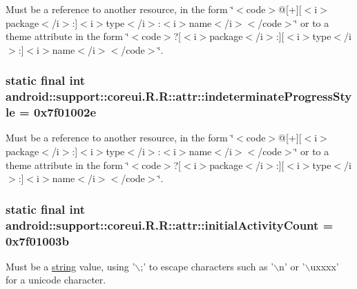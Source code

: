 Must be a reference to another resource, in the form \char`\"{}$<$code$>$@\mbox{[}+\mbox{]}\mbox{[}$<$i$>$package$<$/i$>$:\mbox{]}$<$i$>$type$<$/i$>$:$<$i$>$name$<$/i$>$$<$/code$>$\char`\"{} or to a theme attribute in the form \char`\"{}$<$code$>$?\mbox{[}$<$i$>$package$<$/i$>$:\mbox{]}\mbox{[}$<$i$>$type$<$/i$>$:\mbox{]}$<$i$>$name$<$/i$>$$<$/code$>$\char`\"{}. \hypertarget{classandroid_1_1support_1_1coreui_1_1_r_1_1attr_35b300945e35a3b8eacceb04aa6fc618}{
\subsubsection[{indeterminateProgressStyle}]{\setlength{\rightskip}{0pt plus 5cm}static final int android::support::coreui.R.R::attr::indeterminateProgressStyle = 0x7f01002e}}
\label{classandroid_1_1support_1_1coreui_1_1_r_1_1attr_35b300945e35a3b8eacceb04aa6fc618}


Must be a reference to another resource, in the form \char`\"{}$<$code$>$@\mbox{[}+\mbox{]}\mbox{[}$<$i$>$package$<$/i$>$:\mbox{]}$<$i$>$type$<$/i$>$:$<$i$>$name$<$/i$>$$<$/code$>$\char`\"{} or to a theme attribute in the form \char`\"{}$<$code$>$?\mbox{[}$<$i$>$package$<$/i$>$:\mbox{]}\mbox{[}$<$i$>$type$<$/i$>$:\mbox{]}$<$i$>$name$<$/i$>$$<$/code$>$\char`\"{}. \hypertarget{classandroid_1_1support_1_1coreui_1_1_r_1_1attr_07b717adc8f0cdad1a3a8ca67f2ba1a2}{
\subsubsection[{initialActivityCount}]{\setlength{\rightskip}{0pt plus 5cm}static final int android::support::coreui.R.R::attr::initialActivityCount = 0x7f01003b}}
\label{classandroid_1_1support_1_1coreui_1_1_r_1_1attr_07b717adc8f0cdad1a3a8ca67f2ba1a2}


Must be a \hyperlink{classandroid_1_1support_1_1coreui_1_1_r_1_1string}{string} value, using '$\backslash$;' to escape characters such as '$\backslash$n' or '$\backslash$uxxxx' for a unicode character. 


